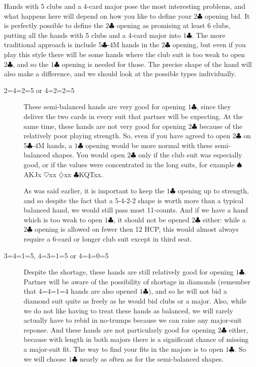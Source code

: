 \documentclass{article}
\newcommand{\sz}{\spadesuit}
\newcommand{\hz}{\heartsuit}
\newcommand{\dz}{\diamondsuit}
\newcommand{\cz}{\clubsuit}
\begin{document}
Hands with 5 clubs and a 4-card major pose the most interesting problems, and what happens here will depend on how you like to define your $2\cz$ opening bid. It is perfectly possible to define the $2\cz$ opening as promising at least 6 clubs, putting all the hands with 5 clubs and a 4-card major into $1\cz$. The more traditional approach is include 5$\cz$-4M hands in the $2\cz$ opening, but even if you play this style there will be some hands where the club suit is too weak to open $2\cz$, and so the $1\cz$ opening is needed for those. The precise shape of the hand will also make a difference, and we should look at the possible types individually.

\begin{description}
\item[2=4=2=5 or 4=2=2=5] These semi-balanced hands are very good for opening $1\cz$, since they deliver the two cards in every suit that partner will be expecting. At the same time, these hands are not very good for opening $2\cz$ because of the relatively poor playing strength. So, even if you have agreed to open $2\cz$ on 5$\cz$-4M hands, a $1\cz$ opening would be more normal with these semi-balanced shapes. You would open $2\cz$ only if the club suit was especially good, or if the values were concentrated in the long suits, for example $\sz$AKJx $\hz$xx $\dz$xx $\cz$KQTxx.

As was said earlier, it is important to keep the $1\cz$ opening up to strength, and so despite the fact that a 5-4-2-2 shape is worth more than a typical balanced hand, we would still pass most 11-counts. And if we have a hand which is too weak to open $1\cz$, it should not be opened $2\cz$ either: while a $2\cz$ opening is allowed on fewer then 12 HCP, this would almost always require a 6-card or longer club suit except in third seat.

\item[3=4=1=5, 4=3=1=5 or 4=4=0=5] Despite the shortage, these hands are still relatively good for opening $1\cz$. Partner will be aware of the possibility of shortage in diamonds (remember that 4=4=1=4 hands are also opened $1\cz$), and so he will not bid a diamond suit quite as freely as he would bid clubs or a major. Also, while we do not like having to treat these hands as balanced, we will rarely actually have to rebid in no-trumps because we can raise any major-suit reponse. And these hands are not particularly good for opening $2\cz$ either, because with length in both majors there is a significant chance of missing a major-suit fit. The way to find your fits in the majors is to open $1\cz$. So we will choose $1\cz$ nearly as often as for the semi-balanced shapes.


\end{description}
\end{document}
